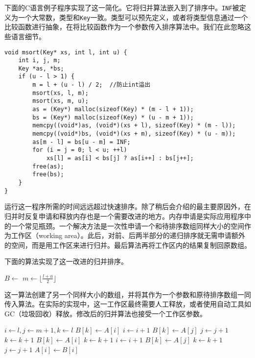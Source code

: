 \documentclass[UTF8]{article}
\begin{document}
下面的C语言例子程序实现了这一简化。它将归并算法嵌入到了排序中。\texttt{INF}被定义为一个大常数，类型和\texttt{Key}一致。类型可以预先定义，或者将类型信息通过一个比较函数进行抽象，在将比较函数作为一个参数传入排序算法中。我们在此忽略这些语言细节。

\lstset{language=C}
\begin{lstlisting}
void msort(Key* xs, int l, int u) {
    int i, j, m;
    Key *as, *bs;
    if (u - l > 1) {
        m = l + (u - l) / 2;  //防止int溢出
        msort(xs, l, m);
        msort(xs, m, u);
        as = (Key*) malloc(sizeof(Key) * (m - l + 1));
        bs = (Key*) malloc(sizeof(Key) * (u - m + 1));
        memcpy((void*)as, (void*)(xs + l), sizeof(Key) * (m - l));
        memcpy((void*)bs, (void*)(xs + m), sizeof(Key) * (u - m));
        as[m - l] = bs[u - m] = INF;
        for (i = j = 0; l < u; ++l)
            xs[l] = as[i] < bs[j] ? as[i++] : bs[j++];
        free(as);
        free(bs);
    }
}
\end{lstlisting}

运行这一程序所需的时间远远超过快速排序。除了稍后会介绍的最主要原因外，在归并时反复申请和释放内存也是一个需要改进的地方。内存申请是实际应用程序中的一个常见瓶颈\cite{Bentley}。一个解决方法是一次性申请一个和待排序数组同样大小的空间作为工作区（working area）。此后，对前、后两半部分的递归排序就无需申请额外的空间，而是用工作区来进行归并。最后算法再将工作区内的结果复制回原数组。

下面的算法实现了这一改进的归并排序。

\begin{algorithmic}[1]
  \State $B \gets $ 
  \State {}
\EndProcedure
\Statex
{}
    \State $m \gets \lfloor \frac{l + u}{2} \rfloor$
    \State {}
    \State {}
    \State {}
  \EndIf
\EndProcedure
\end{algorithmic}

这一算法创建了另一个同样大小的数组，并将其作为一个参数和原待排序数组一同传入算法。在实际的实现中，这一工作区最终需要人工释放，或者使用自动工具如GC（垃圾回收）释放。修改后的归并算法也接受一个工作区参数。

\begin{algorithmic}[1]
  \State $i \gets l, j \gets m + 1, k \gets l$
      \State $B[k] \gets A[i]$
      \State $i \gets i + 1$
    \Else
      \State $B[k] \gets A[j]$
      \State $j \gets j + 1$
    \EndIf
    \State $k \gets k + 1$
  \EndWhile
    \State $B[k] \gets A[i]$
    \State $k \gets k + 1$
    \State $i \gets i + 1$
  \EndWhile
    \State $B[k] \gets A[j]$
    \State $k \gets k + 1$
    \State $j \gets j + 1$
  \EndWhile
   
    \State $A[i] \gets B[i]$
  \EndFor
\EndProcedure
\end{algorithmic}
\end{document}
